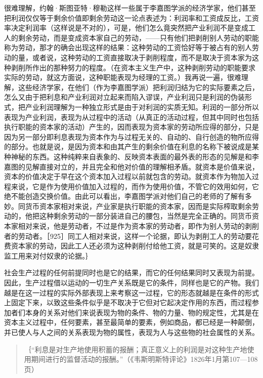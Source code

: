 很难理解，约翰·斯图亚特·穆勒这样一些属于李嘉图学派的经济学家，他们甚至把利润仅仅等于剩余价值即剩余劳动这一论点表述为：利润率和工资成反比，工资率决定利润率（这样说是不对的），可是，他们怎么竟突然把产业利润不是变成工人的剩余劳动，而是变成资本家自己的劳动，——只有他们把剥削别人劳动的职能称为劳动，那才的确会出现这样的结果：这种劳动的工资恰好等于被占有的别人劳动的量，或者说，这种劳动的工资直接取决于剥削程度，而不是取决于资本家为这种剥削所作出的那种努力的程度。（在资本主义生产中，这种剥削劳动的职能要求实际的劳动，就这方面说，这种职能表现为经理的工资。）我再说一遍，很难理解，这些经济学家，在他们（作为李嘉图学派）把利润归结为它的实际要素之后，怎么又由于把利息和产业利润对立起来而陷入谬误，产业利润只是利润的伪装形式，把产业利润理解为一种独立形式是由于对利润的实质无知。利润的一部分所以表现为产业利润，表现为从过程中的活动（从真正的活动过程，但其中同时也包括执行职能的资本家的活动）产生的，因而表现为资本家的劳动所应得的部分，只是因为另一部分即利息表现为资本作为与过程无关的、自动的、自行创造的物所应得的部分。也就是说，是因为资本和由其产生的剩余价值在利息的名称下被说成是某种神秘的东西。这种纯粹来自表象的、反映资本表面的最外表的形态的见解是和李嘉图的见解直接对立的，并且完全和他对价值的理解相矛盾。就资本是价值来说，资本的价值决定于早在这个资本加入过程以前就包含的劳动。就资本作为物加入过程来说，它是作为使用价值加入过程的，而作为使用价值，不管它的效用如何，它绝不能创造交换价值。由此可以看出，李嘉图学派对他们自己的老师的了解有多妙。同货币资本家相对来说，产业家是执行职能的资本家，因而是实际榨取剩余劳动的，他把这种剩余劳动的一部分装进自己的腰包，当然是完全正确的。同货币资本家相对来说，他是劳动者，不过是作为资本家的劳动者，即作为别人劳动的剥削者的劳动者。［925］同工人相对来说，这样一个论据，即认为剥削工人的劳动要花费资本家的劳动，因此工人还必须为这种剥削付给他工资，就是可笑的。这是奴隶监工用来对付奴隶的论据。｝


社会生产过程的任何前提同时也是它的结果，而它的任何结果同时又表现为前提。因此，生产过程借以运动的一切生产关系既是它的条件，同样也是它的产物。我们越是在这一过程的实际外部表现上来考察这一过程，它的形态就越是在条件的形式上固定下来，以致这些条件似乎是不取决于它但对它起决定作用的东西，而过程参加者们本身的关系对他们来说表现为物的条件、物的力量、物的规定性，尤其是在资本主义过程中，任何要素，甚至最简单的要素，例如商品，都已经是一种颠倒，并已使人与人之间的关系表现为物的属性，表现为人与这些物的社会属性的关系。

\begin{quote}{｛“利息是对生产地使用积蓄的报酬；真正意义上的利润是对这种生产地使用期间进行的监督活动的报酬。”（《韦斯明斯特评论》1826年1月第107—108页）}\end{quote}


